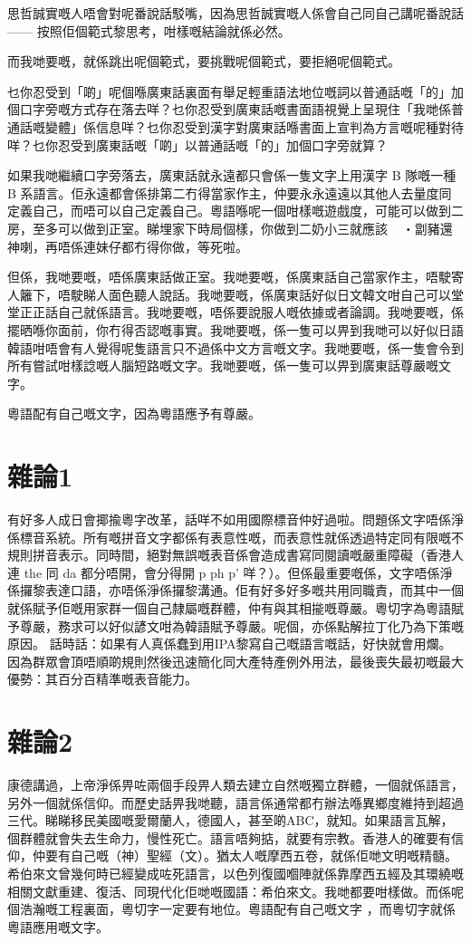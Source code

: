 \documentclass[a5paper, 10pt, openany]{book} %
\begin{document}
思哲誠實嘅人唔會對呢番說話駁嘴，因為思哲誠實嘅人係會自己同自己講呢番說話—— 按照佢個範式黎思考，咁樣嘅結論就係必然。

而我哋要嘅，就係跳出呢個範式，要挑戰呢個範式，要拒絕呢個範式。

乜你忍受到「啲」呢個喺廣東話裏面有舉足輕重語法地位嘅詞以普通話嘅「的」加個口字旁嘅方式存在落去咩？乜你忍受到廣東話嘅書面語視覺上呈現住「我哋係普通話嘅變體」係信息咩？乜你忍受到漢字對廣東話喺書面上宣判為方言嘅呢種對待咩？乜你忍受到廣東話嘅「啲」以普通話嘅「的」加個口字旁就算？

如果我哋繼續口字旁落去，廣東話就永遠都只會係一隻文字上用漢字 B 隊嘅一種 B 系語言。佢永遠都會係排第二冇得當家作主，仲要永永遠遠以其他人去量度同定義自己，而唔可以自己定義自己。粵語喺呢一個咁樣嘅遊戲度，可能可以做到二房，至多可以做到正室。睇埋家下時局個樣，你做到二奶小三就應該・劏豬還神喇，再唔係連妹仔都冇得你做，等死啦。

但係，我哋要嘅，唔係廣東話做正室。我哋要嘅，係廣東話自己當家作主，唔駛寄人籬下，唔駛睇人面色聽人說話。我哋要嘅，係廣東話好似日文韓文咁自己可以堂堂正正話自己就係語言。我哋要嘅，唔係要說服人嘅依據或者論調。我哋要嘅，係擺晒喺你面前，你冇得否認嘅事實。我哋要嘅，係一隻可以畀到我哋可以好似日語韓語咁唔會有人覺得呢隻語言只不過係中文方言嘅文字。我哋要嘅，係一隻會令到所有嘗試咁樣諗嘅人腦短路嘅文字。我哋要嘅，係一隻可以畀到廣東話尊嚴嘅文字。

粵語配有自己嘅文字，因為粵語應予有尊嚴。

\chapter{雜論1}
有好多人成日會揶揄粵字改革，話咩不如用國際標音仲好過啦。問題係文字唔係淨係標音系統。所有嘅拼音文字都係有表意性嘅，而表意性就係透過特定同有限嘅不規則拼音表示。同時間，絕對無誤嘅表音係會造成書寫同閱讀嘅嚴重障礙（香港人連 the 同 da 都分唔開，會分得開 p ph p’ 咩？）。但係最重要嘅係，文字唔係淨係攞黎表達口語，亦唔係淨係攞黎溝通。佢有好多好多嘅共用同職責，而其中一個就係賦予佢嘅用家群一個自己隸屬嘅群體，仲有與其相㨢嘅尊嚴。粵切字為粵語賦予尊嚴，務求可以好似諺文咁為韓語賦予尊嚴。呢個，亦係點解拉丁化乃為下策嘅原因。
話時話：如果有人真係蠢到用IPA黎寫自己嘅語言嘅話，好快就會用爛。因為群眾會頂唔順啲規則然後迅速簡化同大產特產例外用法，最後喪失最初嘅最大優勢：其百分百精準嘅表音能力。

\chapter{雜論2}
康德講過，上帝淨係畀咗兩個手段畀人類去建立自然嘅獨立群體，一個就係語言，另外一個就係信仰。而歷史話畀我哋聽，語言係通常都冇辦法喺異鄉度維持到超過三代。睇睇移民美國嘅愛爾蘭人，德國人，甚至啲ABC，就知。如果語言瓦解，個群體就會失去生命力，慢性死亡。語言唔夠掂，就要有宗教。香港人的確要有信仰，仲要有自己嘅（神）聖經（文）。猶太人嘅摩西五卷，就係佢哋文明嘅精髓。希伯來文曾幾何時已經變成咗死語言，以色列復國嗰陣就係靠摩西五經及其環繞嘅相關文獻重建、復活、同現代化佢哋嘅國語：希伯來文。我哋都要咁樣做。而係呢個浩瀚嘅工程裏面，粵切字一定要有地位。粵語配有自己嘅文字 ，而粵切字就係粵語應用嘅文字。
\end{document}
